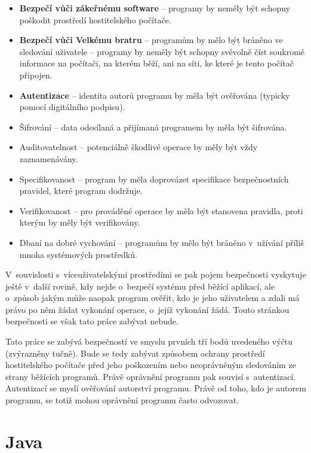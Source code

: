 \begin{itemize}
  \item {\bf Bezpečí vůči zákeřnému software} -- programy by neměly být schopny poškodit prostředí hostitelského počítače.
  \item {\bf Bezpečí vůči Velkému bratru} -- programům by mělo být bráněno ve sledování uživatele -- programy by neměly být schopny svévolně číst soukromé informace na počítači, na kterém běží, ani na síti, ke které je tento počítač připojen.
  \item {\bf Autentizace} -- identita autorů programu by měla být ověřována (typicky pomocí digitálního podpisu).
  \item Šifrování -- data odesílaná a přijímaná programem by měla být šifrována.
  \item Auditovatelnost -- potenciálně škodlivé operace by měly být vždy zaznamenávány.
  \item Specifikovanost -- program by měla doprovázet specifikace bezpečnostních pravidel, které program dodržuje.
  \item Verifikovanost -- pro prováděné operace by měla být stanovena pravidla, proti kterým by měly být verifikovány.
  \item Dbaní na dobré vychování -- programům by mělo být bráněno v~užívání příliš mnoha systémových prostředků.
\end{itemize}

V~souvislosti s~víceuživatelskými prostředími se pak pojem bezpečnosti vyskytuje ještě v~další rovině, kdy nejde o~bezpečí systému před běžící aplikací, ale o~způsob jakým může naopak program ověřit, kdo je jeho uživatelem a zdali má právo po něm žádat vykonání operace, o~jejíž vykonání žádá. Touto stránkou bezpečnosti se však tato práce zabývat nebude.

Tato práce se zabývá bezpečností ve smyslu prvních tří bodů uvedeného výčtu (zvýrazněny tučně). Bude se tedy zabývat způsobem ochrany prostředí hostitelského počítače před jeho poškozením nebo neoprávněným sledováním ze strany běžících programů. Právě oprávnění programu pak souvisí s~autentizací. Autentizací se myslí ověřování autorství programu. Právě od toho, kdo je autorem programu, se totiž mohou oprávnění programu často odvozovat.

\section{Java}

